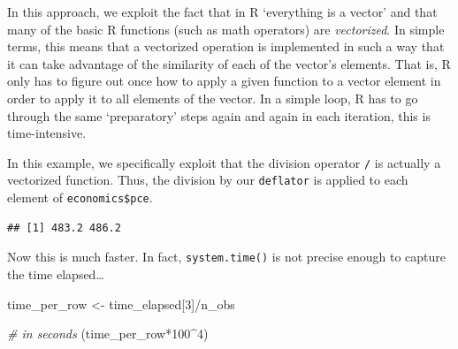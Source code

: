 \documentclass[
  12pt,
]{style/krantz}
\newenvironment{Shaded}{\begin{snugshade}}{\end{snugshade}}
\newcommand{\CommentTok}[1]{\textcolor[rgb]{0.56,0.35,0.01}{\textit{#1}}}
\newcommand{\DecValTok}[1]{\textcolor[rgb]{0.00,0.00,0.81}{#1}}
\newcommand{\FloatTok}[1]{\textcolor[rgb]{0.00,0.00,0.81}{#1}}
\newcommand{\FunctionTok}[1]{\textcolor[rgb]{0.00,0.00,0.00}{#1}}
\newcommand{\NormalTok}[1]{#1}
\newcommand{\OtherTok}[1]{\textcolor[rgb]{0.56,0.35,0.01}{#1}}
\newcommand{\SpecialCharTok}[1]{\textcolor[rgb]{0.00,0.00,0.00}{#1}}
\begin{document}
In this approach, we exploit the fact that in R `everything is a vector' and that many of the basic R functions (such as math operators) are \emph{vectorized}. In simple terms, this means that a vectorized operation is implemented in such a way that it can take advantage of the similarity of each of the vector's elements. That is, R only has to figure out once how to apply a given function to a vector element in order to apply it to all elements of the vector. In a simple loop, R has to go through the same `preparatory' steps again and again in each iteration, this is time-intensive.

In this example, we specifically exploit that the division operator \texttt{/} is actually a vectorized function. Thus, the division by our \texttt{deflator} is applied to each element of \texttt{economics\$pce}.

\begin{Shaded}
\end{Shaded}

\begin{verbatim}
## [1] 483.2 486.2
\end{verbatim}

Now this is much faster. In fact, \texttt{system.time()} is not precise enough to capture the time elapsed\ldots{}

\begin{Shaded}
\begin{Highlighting}[]
\NormalTok{time\_per\_row }\OtherTok{\textless{}{-}}\NormalTok{ time\_elapsed[}\DecValTok{3}\NormalTok{]}\SpecialCharTok{/}\NormalTok{n\_obs}

\CommentTok{\# in seconds}
\NormalTok{(time\_per\_row}\SpecialCharTok{*}\DecValTok{100}\SpecialCharTok{\^{}}\DecValTok{4}\NormalTok{) }
\end{Highlighting}
\end{Shaded}
\end{document}

